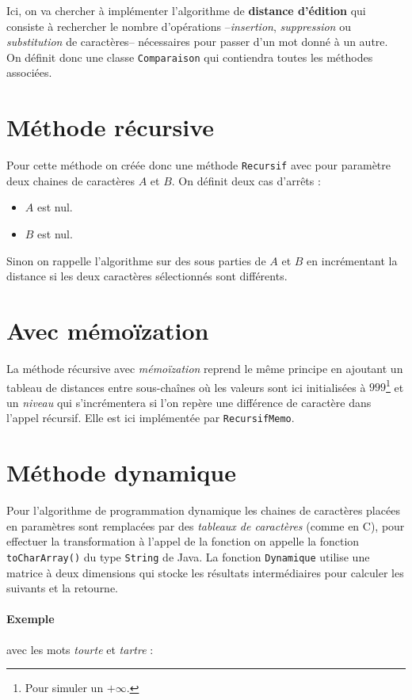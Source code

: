\documentclass[12pt, a4paper]{report}
\begin{document}
{    Ici, on va chercher à implémenter l'algorithme de \textbf{distance d'édition} qui consiste à rechercher le nombre d'opérations --\emph{insertion}, \emph{suppression} ou \emph{substitution} de caractères-- nécessaires pour passer d'un mot donné à un autre. On définit donc une classe \texttt{Comparaison} qui contiendra toutes les méthodes associées.

    \section{Méthode récursive}

    Pour cette méthode on créée donc une méthode \texttt{Recursif} avec pour paramètre deux chaines de caractères $A$ et $B$. On définit deux cas d'arrêts :
    \begin{itemize}
        \item $A$ est nul.
        \item $B$ est nul.
    \end{itemize}
    Sinon on rappelle l'algorithme sur des sous parties de $A$ et $B$ en incrémentant la distance si les deux caractères sélectionnés sont différents.

    \section{Avec mémoïzation}

    La méthode récursive avec \emph{mémoïzation} reprend le même principe en ajoutant un tableau de distances entre sous-chaînes où les valeurs sont ici initialisées à $999$\footnote{Pour simuler un $+\infty$.} et un \emph{niveau} qui s'incrémentera si l'on repère une différence de caractère dans l'appel récursif. Elle est ici implémentée par \texttt{RecursifMemo}.

    \section{Méthode dynamique}

    Pour l'algorithme de programmation dynamique les chaines de caractères placées en paramètres sont remplacées par des \emph{tableaux de caractères} (comme en C), pour effectuer la transformation à l'appel de la fonction on appelle la fonction \texttt{toCharArray()} du type \texttt{String} de Java. La fonction \texttt{Dynamique} utilise une matrice à deux dimensions qui stocke les résultats intermédiaires pour calculer les suivants et la retourne.

    \paragraph{Exemple} avec les mots \emph{tourte} et \emph{tartre} :

}
\end{document}
